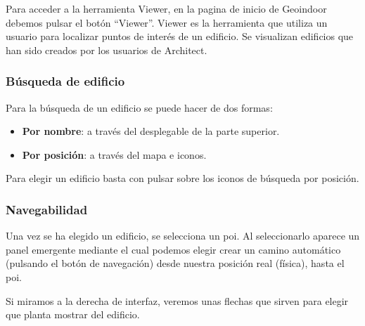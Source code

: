 Para acceder a la herramienta Viewer, en la pagina de inicio de Geoindoor debemos pulsar el botón ``Viewer''. Viewer es la herramienta que utiliza un usuario para localizar puntos de interés de un edificio. Se visualizan edificios que han sido creados por los usuarios de Architect.
\newpage
{}

\subsubsection{Búsqueda de edificio}

Para la búsqueda de un edificio se puede hacer de dos formas:

\begin{itemize}
	\item \textbf{Por nombre}: a través del desplegable de la parte superior.
	\item \textbf{Por posición}: a través del mapa e iconos.
\end{itemize} 


Para elegir un edificio basta con pulsar sobre los iconos de búsqueda por posición.

\subsubsection{Navegabilidad}

Una vez se ha elegido un edificio, se selecciona un poi. Al seleccionarlo aparece un panel emergente mediante el cual podemos elegir crear un camino automático (pulsando el botón de navegación) desde nuestra posición real (física), hasta el poi.




\newpage
Si miramos a la derecha de interfaz, veremos unas flechas que sirven para elegir que planta mostrar del edificio.


